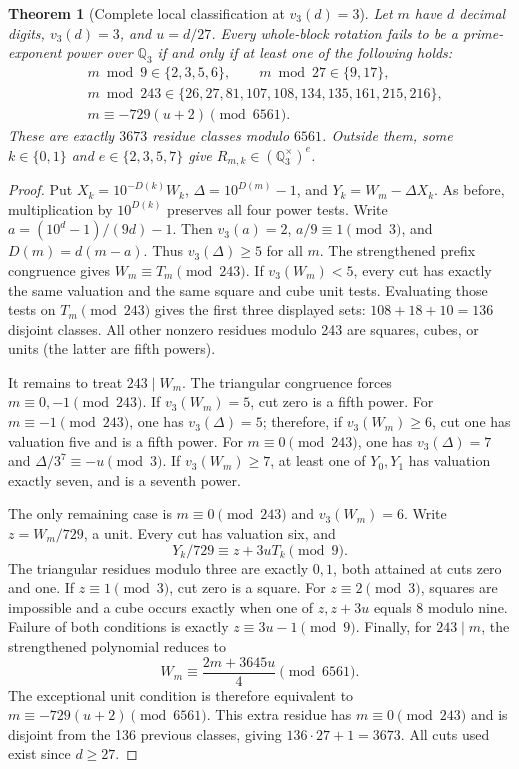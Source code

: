 \documentclass[10pt]{article}
\newtheorem{theorem}{Theorem}
\begin{document}
\begin{theorem}[Complete local classification at $v_3(d)=3$]\label{thm:h3-complete}
Let $m$ have $d$ decimal digits, $v_3(d)=3$, and $u=d/27$.
Every whole-block rotation fails to be a prime-exponent power over
$\mathbb Q_3$ if and only if at least one of the following holds:
\[
\begin{split}
&m\bmod9\in\{2,3,5,6\},\qquad m\bmod27\in\{9,17\},\\
&m\bmod243\in\{26,27,81,107,108,134,135,161,215,216\},\\
&m\equiv-729(u+2)\pmod{6561}.
\end{split}
\]
These are exactly $3673$ residue classes modulo $6561$.
Outside them, some $k\in\{0,1\}$ and $e\in\{2,3,5,7\}$ give
$R_{m,k}\in(\mathbb Q_3^\times)^e$.
\end{theorem}
\begin{proof}
Put $X_k=10^{-D(k)}W_k$, $\Delta=10^{D(m)}-1$, and
$Y_k=W_m-\Delta X_k$.
As before, multiplication by $10^{D(k)}$ preserves all four power tests.
Write $a=(10^d-1)/(9d)-1$. Then $v_3(a)=2$,
$a/9\equiv1\pmod3$, and $D(m)=d(m-a)$.
Thus $v_3(\Delta)\ge5$ for all $m$.
The strengthened prefix congruence gives $W_m\equiv T_m\pmod{243}$.
If $v_3(W_m)<5$, every cut has exactly the same valuation and the same
square and cube unit tests. Evaluating those tests on $T_m\pmod{243}$
gives the first three displayed sets: $108+18+10=136$ disjoint classes.
All other nonzero residues modulo 243 are squares, cubes, or units
(the latter are fifth powers).

It remains to treat $243\mid W_m$. The triangular congruence forces
$m\equiv0,-1\pmod{243}$. If $v_3(W_m)=5$, cut zero is a fifth power.
For $m\equiv-1\pmod{243}$, one has $v_3(\Delta)=5$;
therefore, if $v_3(W_m)\ge6$, cut one has valuation five and is a
fifth power. For $m\equiv0\pmod{243}$, one has
$v_3(\Delta)=7$ and $\Delta/3^7\equiv-u\pmod3$.
If $v_3(W_m)\ge7$, at least one of $Y_0,Y_1$ has valuation exactly
seven, and is a seventh power.

The only remaining case is $m\equiv0\pmod{243}$ and
$v_3(W_m)=6$. Write $z=W_m/729$, a unit. Every cut has valuation six,
and
\[
 Y_k/729\equiv z+3uT_k\pmod9.
\]
The triangular residues modulo three are exactly $0,1$, both attained
at cuts zero and one. If $z\equiv1\pmod3$, cut zero is a square.
For $z\equiv2\pmod3$, squares are impossible and a cube occurs
exactly when one of $z,z+3u$ equals 8 modulo nine. Failure of both
conditions is exactly $z\equiv3u-1\pmod9$.
Finally, for $243\mid m$, the strengthened polynomial reduces to
\[
 W_m\equiv\frac{2m+3645u}{4}\pmod{6561}.
\]
The exceptional unit condition is therefore equivalent to
$m\equiv-729(u+2)\pmod{6561}$.
This extra residue has $m\equiv0\pmod{243}$ and is disjoint from the
136 previous classes, giving $136\cdot27+1=3673$.
All cuts used exist since $d\ge27$.
\end{proof}
\end{document}
